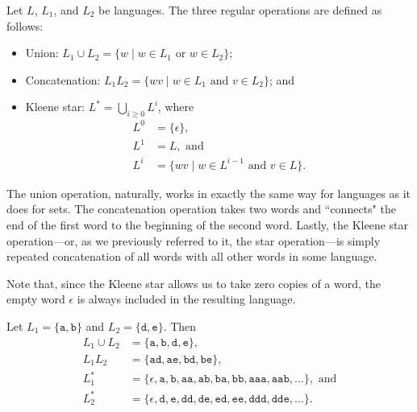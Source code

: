 \begin{definition}\label{def:regularoperations}
Let $L$, $L_{1}$, and $L_{2}$ be languages. The three regular operations are defined as follows:
\begin{itemize}
\item Union: $L_{1} \cup L_{2} = \{w \mid w \in L_{1} \text{ or } w \in L_{2}\}$;
\item Concatenation: $L_{1}L_{2} = \{wv \mid w \in L_{1} \text{ and } v \in L_{2}\}$; and
\item Kleene star: $L^{*} = \bigcup_{i \geq 0} L^{i}$, where
	\begin{align*}
	L^{0}		&= \{\epsilon\}, \\
	L^{1}		&= L, \text{ and} \\
	L^{i}		&= \{wv \mid w \in L^{i-1} \text{ and } v \in L\}.
	\end{align*}
\end{itemize}
\end{definition}

The union operation, naturally, works in exactly the same way for languages as it does for sets. The concatenation operation takes two words and ``connects" the end of the first word to the beginning of the second word. Lastly, the Kleene star operation---or, as we previously referred to it, the star operation---is simply repeated concatenation of all words with all other words in some language.

Note that, since the Kleene star allows us to take zero copies of a word, the empty word $\epsilon$ is always included in the resulting language.

\begin{example}
Let $L_{1} = \{\texttt{a}, \texttt{b}\}$ and $L_{2} = \{\texttt{d}, \texttt{e}\}$. Then
\begin{align*}
L_{1} \cup L_{2} &= \{\texttt{a}, \texttt{b}, \texttt{d}, \texttt{e}\}, \\
L_{1}L_{2} &= \{\texttt{ad}, \texttt{ae}, \texttt{bd}, \texttt{be}\}, \\
L_{1}^{*} &= \{\epsilon, \texttt{a}, \texttt{b}, \texttt{aa}, \texttt{ab}, \texttt{ba}, \texttt{bb}, \texttt{aaa}, \texttt{aab}, \dots\}, \text{ and} \\
L_{2}^{*} &= \{\epsilon, \texttt{d}, \texttt{e}, \texttt{dd}, \texttt{de}, \texttt{ed}, \texttt{ee}, \texttt{ddd}, \texttt{dde}, \dots\}.
\end{align*}
\end{example}

